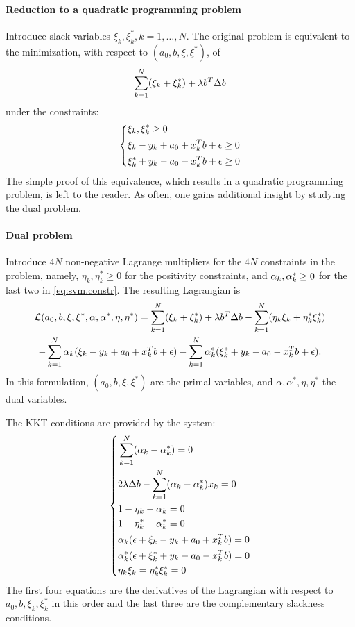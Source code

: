 \paragraph{Reduction to a quadratic programming problem} 
Introduce  slack
variables $\xi_k, \xi_k^*, k=1, \ldots, N$. The original problem
is equivalent to the minimization, with respect to $({a_0}, b, \xi, \xi^*)$, of
$$
\sum_{k=1}^N (\xi_k+ \xi_k^*) + \lambda b^T\Delta b
$$
under the constraints:
\begin{equation}
\label{eq:svm.constr}
\left\{
\begin{aligned} 
&\xi_k, \xi_k^* \geq 0\\ 
&\xi_k - y_k + {a_0} + x_k^Tb +\epsilon \geq 0\\
&\xi_k^* + y_k - {a_0} - 
x_k^Tb +\epsilon \geq 0
\end{aligned}
\right.
\end{equation}
The simple proof of this equivalence, which results in a quadratic programming problem, is left to the reader. As often, one gains additional insight by studying the dual problem.



\paragraph{Dual problem}
Introduce $4N$ non-negative Lagrange multipliers for the  $4N$ constraints in the problem, namely,  $\eta_k, \eta_k^*\geq 0$ for the positivity constraints, and $\alpha_k,
\alpha_k^*\geq 0$ for the last two in \eqref{eq:svm.constr}. The resulting Lagrangian is
\begin{multline*}
\mathcal L ({a_0}, b , \xi, \xi^*, \alpha, \alpha^*, \eta, \eta^*) = \sum_{k=1}^N (\xi_k+ \xi_k^*) + \lambda b^T\Delta b - \sum_{k=1}^N
(\eta_k\xi_k + \eta_k^*\xi_k^*) \\
- \sum_{k=1}^N \alpha_k (\xi_k - y_k +
{a_0} + x_k^Tb + \epsilon)  - \sum_{k=1}^N \alpha_k^* (\xi^*_k + y_k - {a_0} -
x_k^Tb + \epsilon) .
\end{multline*}
In this formulation,
$({a_0}, b, \xi, \xi^*)$ are the primal variables, and $\alpha, \alpha^*,
\eta, \eta^*$ the dual variables.


The KKT conditions are provided by the system:
\begin{equation}
\label{eq:SVM.KKT}
\left\{\begin{aligned}
&\sum_{k=1}^N (\alpha_k-\alpha_k^*) = 0 \\
&2 \lambda \Delta b - \sum_{k=1}^N (\alpha_k-\alpha_k^*) x_k = 0\\
&1 - \eta_k - \alpha_k = 0 \\
&1 - \eta_k^* - \alpha_k^* = 0 \\
&\alpha_k (\epsilon + \xi_k - y_k + {a_0} +  x_k^Tb) = 0  \\
&\alpha_k^* (\epsilon + \xi_k^* + y_k - {a_0} - x_k^Tb) = 0  \\
&\eta_k\xi_k = \eta_k^*\xi_k^* = 0
       \end{aligned}
\right.
\end{equation}
The first four equations are the derivatives of the Lagrangian with respect to ${a_0}, b, \xi_k, \xi^*_k$ in this order and the last three are the complementary slackness conditions.

